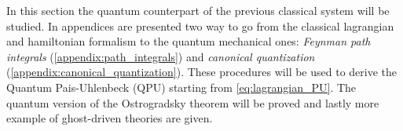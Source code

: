 In this section the quantum counterpart of the previous classical system will be
studied. In appendices are presented two way to go from the classical
lagrangian and hamiltonian formalism to the quantum mechanical ones:
\emph{Feynman path integrals} (\ref{appendix:path_integrals}) and
\emph{canonical quantization} (\ref{appendix:canonical_quantization}). These
procedures will be used to derive the Quantum Pais-Uhlenbeck (QPU) starting from
\eqref{eq:lagrangian_PU}. The quantum version of the Ostrogradsky theorem will
be proved and lastly more example of ghost-driven theories are given.
